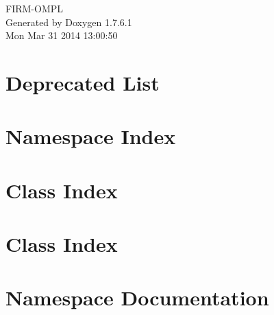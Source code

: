 \documentclass[a4paper]{book}
\begin{document}
\hypersetup{pageanchor=false,citecolor=blue}
\begin{titlepage}
\vspace*{7cm}
\begin{center}
{\Large \-F\-I\-R\-M-\/\-O\-M\-P\-L }\\
\vspace*{1cm}
{\large \-Generated by Doxygen 1.7.6.1}\\
\vspace*{0.5cm}
{\small Mon Mar 31 2014 13:00:50}\\
\end{center}
\end{titlepage}
\clearemptydoublepage
{}
\tableofcontents
\clearemptydoublepage
{}
\hypersetup{pageanchor=true,citecolor=blue}
\chapter{\-Deprecated \-List}
\label{deprecated}
\hypertarget{deprecated}{}

\chapter{\-Namespace \-Index}

\chapter{\-Class \-Index}

\chapter{\-Class \-Index}

\chapter{\-Namespace \-Documentation}

\end{document}
